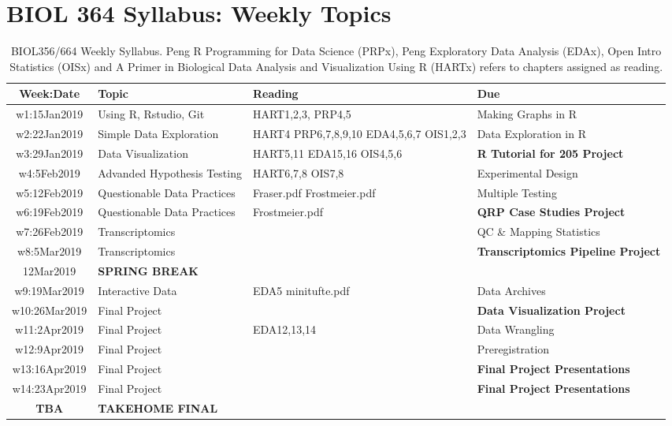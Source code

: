 \documentclass[11pt]{article} %
\begin{document}
\section{BIOL 364 Syllabus: Weekly Topics}
\begin{table}[ht] 
	\centering %
	\begin{tabular}{| c | p{5cm} | p{3cm} | p{5.5cm} |} %
	\hline %
	Week:Date & Topic & Reading & Due  \\ %
	\hline 
	\hline %
  w1:15Jan2019 & Using R, Rstudio, Git & HART1,2,3, PRP4,5 & Making Graphs in R \\ %
	\hline
	w2:22Jan2019 & Simple Data Exploration & HART4 PRP6,7,8,9,10 EDA4,5,6,7 OIS1,2,3 & Data Exploration in R \\ 
	\hline
	w3:29Jan2019 & Data Visualization & HART5,11 EDA15,16 OIS4,5,6 & {\bf R Tutorial for 205 Project}\\ 
	\hline 
	w4:5Feb2019 & Advanded Hypothesis Testing & HART6,7,8 OIS7,8 & Experimental Design  \\ 
	\hline 
	w5:12Feb2019 & Questionable Data Practices & Fraser.pdf \newline Frostmeier.pdf & Multiple Testing \\ 
	\hline 
	w6:19Feb2019 & Questionable Data Practices  & Frostmeier.pdf & {\bf QRP Case Studies Project} \\ 
	\hline 
	w7:26Feb2019 & Transcriptomics &  & QC \& Mapping Statistics\\ 
	\hline 
	w8:5Mar2019 & Transcriptomics  &  & {\bf Transcriptomics Pipeline Project}\\ 
	\hline 
	12Mar2019 & {\bf SPRING BREAK} &  &  \\ 
	\hline
	w9:19Mar2019 & Interactive Data & EDA5 \newline minitufte.pdf & Data Archives \newline {\bf TAKEHOME MIDTERM} \\ 
	\hline
	w10:26Mar2019 & Final Project & &  {\bf Data Visualization Project} \\
	\hline
	w11:2Apr2019 & Final Project & EDA12,13,14 & Data Wrangling  \\
	\hline
	w12:9Apr2019 & Final Project &  & Preregistration  \\
	\hline
	w13:16Apr2019 & Final Project &  & {\bf Final Project Presentations} \\
	\hline 
	w14:23Apr2019 & Final Project & & {\bf Final Project Presentations}  \\ 
	\hline
	\hline
	\hline
	{\bf TBA}	  & {\bf TAKEHOME FINAL} &   &  \\
	\hline
	\hline
\end{tabular}
 
\caption{BIOL356/664 Weekly Syllabus. Peng R Programming for Data Science (PRPx), Peng Exploratory Data Analysis (EDAx), Open Intro Statistics (OISx) and A Primer in Biological Data Analysis and Visualization Using R (HARTx) refers to chapters assigned as reading. }
\label{table:Syllabus} %
\end{table} 
\end{document}
